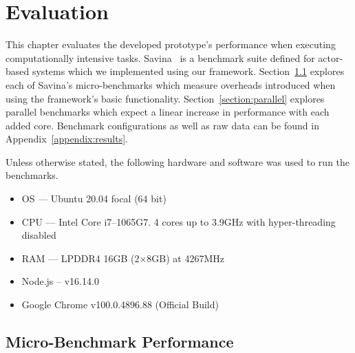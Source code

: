 \documentclass[oneside]{um-fict}
\begin{document}
\chapter{Evaluation}\label{chap:evaluation}
This chapter evaluates the developed prototype's performance when executing computationally intensive tasks. Savina~\cite{savina} is a benchmark suite defined for actor-based systems which we implemented using our framework. Section~\ref{section:microbenchmark} explores each of Savina's micro-benchmarks which measure overheads introduced when using the framework's basic functionality. Section~\ref{section:parallel} explores parallel benchmarks which expect a linear increase in performance with each added core. Benchmark configurations as well as raw data can be found in Appendix~\ref{appendix:results}.

Unless otherwise stated, the following hardware and software was used to run the benchmarks.
\begin{itemize}
    \item OS --- Ubuntu 20.04 focal (64 bit)
    \item CPU --- Intel Core i7--1065G7. 4 cores up to 3.9GHz with hyper-threading disabled
    \item RAM --- LPDDR4 16GB (2$\times$8GB) at 4267MHz
    \item Node.js – v16.14.0
    \item Google Chrome v100.0.4896.88 (Official Build)
\end{itemize}

\section{Micro-Benchmark Performance}\label{section:microbenchmark}
\end{document}
